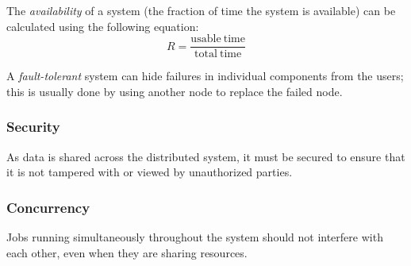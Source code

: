 The \textit{availability} of a system (the fraction of time the system is available) can be calculated using the following equation:
\[ R = \frac{\mathrm{usable\ time}}{\mathrm{total\ time}} \]

A \textit{fault-tolerant} system can hide failures in individual components from the users; this is usually done by using another node to replace the failed node.

\subsubsection{Security}
As data is shared across the distributed system, it must be secured to ensure that it is not tampered with or viewed by unauthorized parties.

\subsubsection{Concurrency}
Jobs running simultaneously throughout the system should not interfere with each other, even when they are sharing resources.